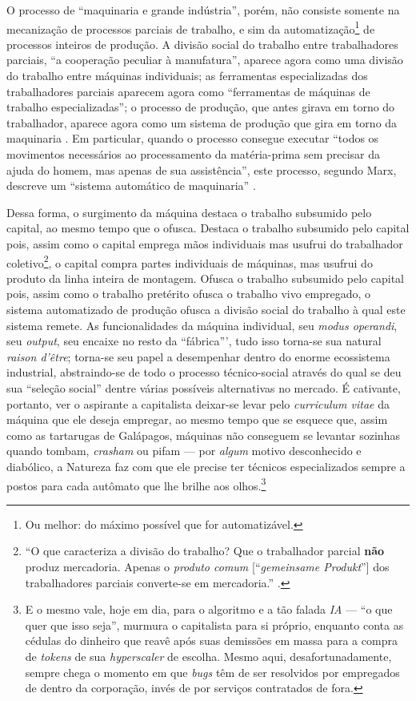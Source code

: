 O processo de ``maquinaria e grande indústria'', porém, não consiste somente na mecanização de processos parciais de trabalho, e sim da automatização\footnote{Ou melhor: do máximo possível que for automatizável.} de processos inteiros de produção. A divisão social do trabalho entre trabalhadores parciais, ``a cooperação peculiar à manufatura'', aparece agora como uma divisão do trabalho entre máquinas individuais; as ferramentas especializadas dos trabalhadores parciais aparecem agora como ``ferramentas de máquinas de trabalho especializadas''; o processo de produção, que antes girava em torno do trabalhador, aparece agora como um sistema de produção que gira em torno da maquinaria \parencite[, p. 453]{Marx2017}. Em particular, quando o processo consegue executar ``todos os movimentos necessários ao processamento da matéria-prima sem precisar da ajuda do homem, mas apenas de sua assistência'', este processo, segundo Marx, descreve um ``sistema automático de maquinaria'' \parencite[, p. 455]{Marx2017}.

Dessa forma, o surgimento da máquina destaca o trabalho subsumido pelo capital, ao mesmo tempo que o ofusca. Destaca o trabalho subsumido pelo capital pois, assim como o capital emprega mãos individuais mas usufrui do trabalhador coletivo\footnote{``O que caracteriza a divisão do trabalho? Que o trabalhador parcial \textbf{não} produz mercadoria. Apenas o \textit{produto comum} {[}``\textit{gemeinsame Produkt}''{]} dos trabalhadores parciais converte-se em mercadoria.'' \parencite[, p. 429, grifo e adendo meus]{Marx2017}.}, o capital compra partes individuais de máquinas, mas usufrui do produto da linha inteira de montagem. Ofusca o trabalho subsumido pelo capital pois, assim como o trabalho pretérito ofusca o trabalho vivo empregado, o sistema automatizado de produção ofusca a divisão social do trabalho à qual este sistema remete. As funcionalidades da máquina individual, seu \textit{modus operandi}, seu \textit{output}, seu encaixe no resto da ``fábrica''', tudo isso torna-se sua natural \textit{raison d'être}; torna-se seu papel a desempenhar dentro do enorme ecossistema industrial, abstraindo-se de todo o processo técnico-social através do qual se deu sua ``seleção social'' dentre várias possíveis alternativas no mercado. É cativante, portanto, ver o aspirante a capitalista deixar-se levar pelo \textit{curriculum vitae} da máquina que ele deseja empregar, ao mesmo tempo que se esquece que, assim como as tartarugas de Galápagos, máquinas não conseguem se levantar sozinhas quando tombam, \textit{crasham} ou pifam --- por \textit{algum} motivo desconhecido e diabólico, a Natureza faz com que ele precise ter técnicos especializados sempre a postos para cada autômato que lhe brilhe aos olhos.\footnote{E o mesmo vale, hoje em dia, para o algoritmo e a tão falada \textit{IA} --- ``o que quer que isso seja'', murmura o capitalista para si próprio, enquanto conta as cédulas do dinheiro que reavê após suas demissões em massa para a compra de \textit{tokens} de sua \textit{hyperscaler} de escolha. Mesmo aqui, desafortunadamente, sempre chega o momento em que \textit{bugs} têm de ser resolvidos por empregados de dentro da corporação, invés de por serviços contratados de fora.}

